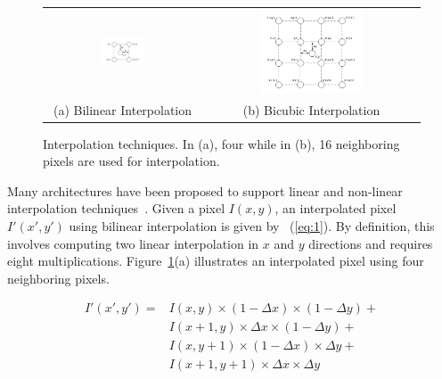 \begin{figure}[!htb]
\centering
\begin{tabular}{@{}c@{} @{}c@{}}
\includegraphics[width=0.3\textwidth]{./figures/bilinear.pdf} & \includegraphics[width=0.5\textwidth]{./figures/bicubic.pdf}\\[\abovecaptionskip]
\small (a) Bilinear Interpolation & \small (b) Bicubic Interpolation
\end{tabular}
\vspace{1pt}
\caption{Interpolation techniques. In (a), four while in (b), 16 neighboring pixels are used for interpolation.}
\label{tab:interpolation}
\end{figure}

Many architectures have been proposed to support linear 
and non-linear interpolation techniques~\cite{kesturdac}.
Given a pixel $I(x,y)$, an interpolated pixel $I'(x',y')$ using bilinear interpolation is given by ~(\ref{eq:1}). By definition, 
this involves computing two linear interpolation in $x$ and $y$ directions and requires eight multiplications. 
Figure~\ref{tab:interpolation}(a) illustrates an interpolated pixel using four neighboring pixels.

\begin{equation}
\begin{split}
I'(x',y') = &I(x,y) \times (1-\Delta x) \times (1-\Delta y) +\\ 
            &I(x+1,y) \times\Delta x \times (1-\Delta y) +\\ 
            &I(x,y+1) \times (1-\Delta x) \times\Delta y +\\ 
            &I(x+1,y+1) \times\Delta x \times\Delta y 
\end{split}
\label{eq:1}
\end{equation}

